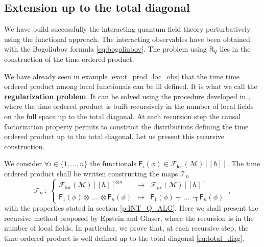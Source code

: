 \documentclass[11pt]{book}
\newcommand{\loc}{\mathsf{loc}}
\newcommand{\muc}{\mu\csf}
\newcommand{\Fcal}{\mathcal{F}}
\newcommand{\Mcal}{\mathcal{M}}
\newcommand{\Tcal}{\mathcal{T}}
\newcommand{\Fsf}{\mathsf{F}}
\newcommand{\Rsf}{\mathsf{R}}
\newcommand{\Tsf}{\mathsf{T}}
\newcommand{\Vsf}{\mathsf{V}}
\newcommand{\csf}{\mathsf{c}}
\theoremstyle{break}
\begin{document}
\subsection{Extension up to the total diagonal}
\label{p:EXT_UP_TOT}


We have build successfully the interacting quantum field theory perturbatively using the functional approach. The interacting observables have been obtained with the Bogoliubov formula \eqref{eq:bogoliubov}. The problem using $\Rsf_\Vsf$ lies in the construction of the time ordered product.


We have already seen in example \ref{exo:t_prod_loc_obs} that the time time ordered product among local functionals can be ill defined. It is what we call the \textbf{regularization problem}. It can be solved using the procedure developed in \cite{BF_2000}, where the time ordered product is built recursively in the number of local fields on the full space up to the total diagonal. At each recursion step the causal factorization property permits to construct the distributions defining the time ordered product up to the total diagonal. Let us present this recursive construction. 


\bigskip


We consider $\forall i \in \{1,\dots,n\}$ the functionals $\Fsf_i(\phi) \in \Fcal_\loc(\Mcal)[[\hbar]]$. The time ordered product shall be written constructing the maps $\Tcal_n$ 
%
\begin{equation*}
\Tcal_n \ : \ 
\left\{
\begin{array}{lcl}
\Fcal_{\loc}(\Mcal)[[\hbar]]^{\otimes n} & \to & \Fcal_{\muc}(\Mcal)[[\hbar]] \\
\Fsf_1(\phi) \otimes \ ... \ \otimes \Fsf_n(\phi) & \mapsto & \Fsf_1(\phi) \cdot_{\Tsf} \ ... \ \cdot_{\Tsf} \Fsf_n(\phi)
\end{array}
\right. \ ,
\end{equation*}
%
with the properties stated in section \ref{p:INT_Q_ALG}. Here we shall present the recursive method proposed by Epstein and Glaser, where the recursion is in the number of local fields. In particular, we prove that, at each recursive step, the time ordered product is well defined up to the total diagonal \eqref{eq:total_diag}.
\end{document}
